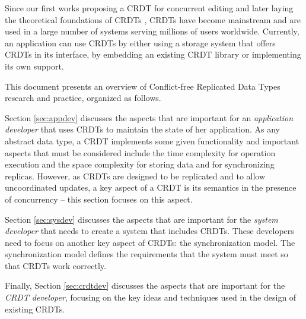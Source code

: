 \documentclass[12pt]{article}
\begin{document}
Since our first works proposing a CRDT for concurrent 
editing \cite{DBLP:journals/corr/abs-0710-1784,Preguica09Commutative} and later laying the theoretical
foundations of CRDTs \cite{Shapiro11Conflict}, CRDTs have become mainstream 
and are used in a large number of systems serving millions of users
worldwide.
Currently, an application can use CRDTs by either using a storage system that offers
CRDTs in its interface,%
by embedding an existing CRDT library or implementing its own support.
 
This document presents an overview of Conflict-free Replicated Data Types
research and practice, organized as follows.

Section \ref{sec:appdev} discusses the aspects that are important 
for an \emph{application developer} that uses CRDTs to maintain the state
of her application.
As any abstract data type, a CRDT implements some given functionality and
important aspects that must be considered include 
the time complexity for operation execution and
the space complexity for storing data and for synchronizing replicas. 
However, as CRDTs are designed to be replicated and to allow uncoordinated 
updates, a key aspect of a CRDT is its semantics in the presence of concurrency
-- this section focuses on this aspect.

Section \ref{sec:sysdev} discusses the aspects that are important for the 
\emph{system developer} that needs to create a system that includes CRDTs.
These developers need to focus on another key aspect of CRDTs: the synchronization model. 
The synchronization model defines the requirements that the system must meet so that
CRDTs work correctly. 

Finally, Section \ref{sec:crdtdev} discusses the aspects that are important for the 
\emph{CRDT developer}, focusing on the key ideas and techniques used in 
the design of existing CRDTs.
\end{document}
